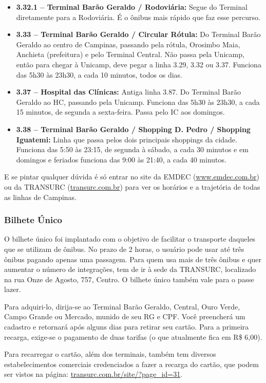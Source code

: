 \begin{itemize}
    \item  \textbf{3.32.1 -- Terminal Barão Geraldo / Rodoviária:} Segue do
        Terminal diretamente para a Rodoviária. É o ônibus mais rápido que faz
        esse percurso.

    \item  \textbf{3.33 -- Terminal Barão Geraldo / Circular Rótula:} Do
        Terminal Barão Geraldo ao centro de Campinas, passando pela rótula,
        Orosimbo Maia, Anchieta (prefeitura) e pelo Terminal Central. Não passa
        pela Unicamp, então para chegar à Unicamp, deve pegar a linha 3.29, 3.32
        ou 3.37. Funciona das 5h30 às 23h30, a cada 10 minutos, todos os dias.

    \item  \textbf{3.37 -- Hospital das Clínicas:} Antiga linha 3.87. Do 
        Terminal Barão Geraldo ao HC, passando pela Unicamp. Funciona das 
        5h30 às 23h30, a cada 15 minutos, de segunda a sexta-feira. Passa 
        pelo IC aos domingos.

    \item  \textbf{3.38 -- Terminal Barão Geraldo / Shopping D. Pedro / Shopping
        Iguatemi:} Linha que passa pelos dois principais shoppings da cidade.
        Funciona das 5:50 às 23:15, de segunda à sábado, a cada 30 minutos e em
        domingos e feriados funciona das 9:00 às 21:40, a cada 40 minutos.
\end{itemize}

E se pintar qualquer dúvida é só entrar no site da EMDEC
(\url{www.emdec.com.br}) ou da TRANSURC (\url{transurc.com.br}) para ver os
horários e a trajetória de todas as linhas de Campinas.

\subsubsection*{Bilhete Único}

O bilhete único foi implantado com o objetivo de facilitar o transporte daqueles
que se utilizam de ônibus. No prazo de 2 horas, o usuário pode usar até três ônibus 
pagando apenas uma passagem. Para quem usa mais de três ônibus e quer aumentar o 
número de integrações, tem de ir à sede da TRANSURC, localizado na rua Onze de Agosto, 
757, Centro. O bilhete único também vale para o passe lazer.

Para adquiri-lo, dirija-se ao Terminal Barão Geraldo, Central, Ouro Verde, Campo
Grande ou Mercado, munido de seu RG e CPF. Você preencherá um cadastro e
retornará após alguns dias para retirar seu cartão. Para a primeira recarga,
exige-se o pagamento de duas tarifas (o que atualmente fica em R\$ 6,00).

Para recarregar o cartão, além dos terminais, também tem diversos
estabelecimentos comerciais credenciados a fazer a recarga do cartão, que podem
ser vistos na página: \url{transurc.com.br/site/?page_id=31}.
